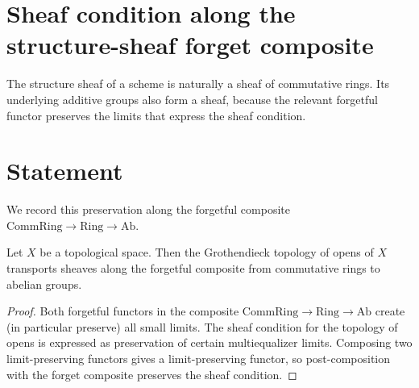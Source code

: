 \section{Sheaf condition along the structure-sheaf forget composite}
\label{mk-chap:Cohomology_SheafCompose}

The structure sheaf of a scheme is naturally a sheaf of commutative rings. Its underlying additive groups also form a sheaf, because the relevant forgetful functor preserves the limits that express the sheaf condition.

\section{Statement}

We record this preservation along the forgetful composite
\(\mathrm{CommRing} \to \mathrm{Ring} \to \mathrm{Ab}\).

\begin{theorem}\label{mk-thm:HasSheafCompose_forget}
  \leanok

  Let \(X\) be a topological space. Then the Grothendieck topology of opens of \(X\) transports sheaves along the forgetful composite from commutative rings to abelian groups.
\end{theorem}

\begin{proof}
  \leanok


Both forgetful functors in the composite \(\mathrm{CommRing} \to \mathrm{Ring} \to \mathrm{Ab}\) create (in particular preserve) all small limits. The sheaf condition for the topology of opens is expressed as preservation of certain multiequalizer limits. Composing two limit-preserving functors gives a limit-preserving functor, so post-composition with the forget composite preserves the sheaf condition.
\end{proof}
